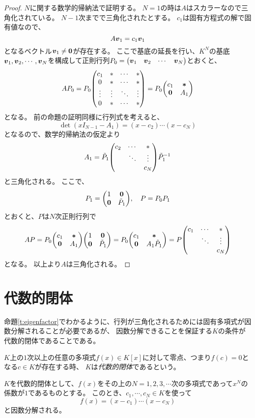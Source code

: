 \begin{proof}
$N$に関する数学的帰納法で証明する。
$N = 1$の時は$A$はスカラーなので三角化されている。
$N-1$次までで三角化されたとする。
$c_1$は固有方程式の解で固有値なので、
$$
A\vb*{v}_1 = c_1\vb*{v}_1
$$
となるベクトル$\vb*{v}_1 \ne \vb*{0}$が存在する。
ここで基底の延長を行い、$K^N$の基底$\vb*{v}_1, \vb*{v}_2, \cdots, \vb*{v}_N$を構成して正則行列$P_0 = \mqty(\vb*{v}_1 & \vb*{v}_2 & \cdots & \vb*{v}_N)$とおくと、
$$
A P_0
= P_0\mqty(c_1 & * & \cdots & * \\ 0 & * & \cdots & * \\ \vdots & \vdots & \ddots & \vdots \\ 0 & * & \cdots & *)
= P_0\mqty(c_1 & \vb*{*} \\ \vb*{0} & A_1)
$$
となる。
前の命題の証明同様に行列式を考えると、
$$
\det(x I_{N-1}-A_1) = (x-c_2)\cdots(x-c_N)
$$
となるので、数学的帰納法の仮定より
$$
A_1 = \tilde{P}_1\mqty(c_2 & \cdots & * \\ & \ddots & \vdots \\ & & c_N)\tilde{P}_1^{-1}
$$
と三角化される。
ここで、
$$
P_1 = \mqty(1 & \vb*{0} \\ \vb*{0} & \tilde{P}_1),
\quad P = P_0 P_1
$$
とおくと、$P$は$N$次正則行列で
$$
A P
= P_0\mqty(c_1 & \vb*{*} \\ \vb*{0} & A_1)\mqty(1 & \vb*{0} \\ \vb*{0} & \tilde{P}_1)
= P_0\mqty(c_1 & \vb*{*} \\ \vb*{0} & A_1\tilde{P}_1)
= P\mqty(c_1 & \cdots & * \\ & \ddots & \vdots \\ & & c_N)
$$
となる。
以上より$A$は三角化される。
\end{proof}

\section{代数的閉体}

命題\ref{t:eigenfactor}でわかるように、行列が三角化されるためには固有多項式が因数分解されることが必要であるが、
因数分解できることを保証する$K$の条件が代数的閉体であることである。

\begin{definition}[代数的閉体]
$K$上の$1$次以上の任意の多項式$f(x) \in K[x]$に対して零点、つまり$f(c) = 0$となる$c \in K$が存在する時、
$K$は\emph{代数的閉体}であるという。
\end{definition}

\begin{proposition}[因数分解]
$K$を代数的閉体として、$f(x)$をその上の$N = 1, 2, 3, \cdots$次の多項式であって$x^N$の係数が$1$であるものとする。
このとき、$c_1, \cdots, c_N \in K$を使って
$$
f(x) = (x-c_1)\cdots(x-c_N)
$$
と因数分解される。
\end{proposition}

